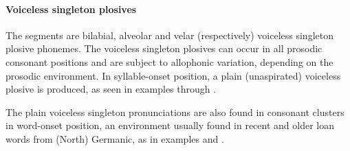 \paragraph{Voiceless singleton plosives}\label{ptk}
The segments  are bilabial, alveolar and velar (respectively) voiceless singleton plosive phonemes. %
The voiceless singleton plosives can occur in all prosodic consonant positions and are subject to allophonic variation, depending on the prosodic environment. In syllable-onset position, a plain (unaspirated) voiceless plosive \ipa{[p\,t\,k]} is produced, as seen in examples  through . %

The plain voiceless singleton pronunciations \ipa{[p\,t\,k]} %
are also found in consonant clusters in word-onset position, an environment usually found in recent and older loan words from (North) Germanic, as in examples  %
and . %
\clearpage
\vspace{-1em}

